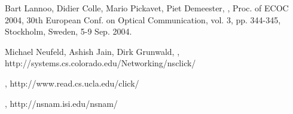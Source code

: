 \documentclass[twocolumn]{phdsymp} %
\begin{document}
\nocite{*}



%
\begin{thebibliography}{1}
Bart Lannoo, Didier Colle, Mario Pickavet, Piet Demeester,
,
\newblock Proc. of ECOC 2004, 30th European Conf. on Optical Communication, vol. 3, pp. 344-345, Stockholm, Sweden, 5-9 Sep. 2004.

Michael Neufeld, Ashish Jain, Dirk Grunwald,
,
\newblock http://systems.cs.colorado.edu/Networking/nsclick/

,
\newblock http://www.read.cs.ucla.edu/click/

,
\newblock http://nsnam.isi.edu/nsnam/

\end{thebibliography}
%
\end{document}
